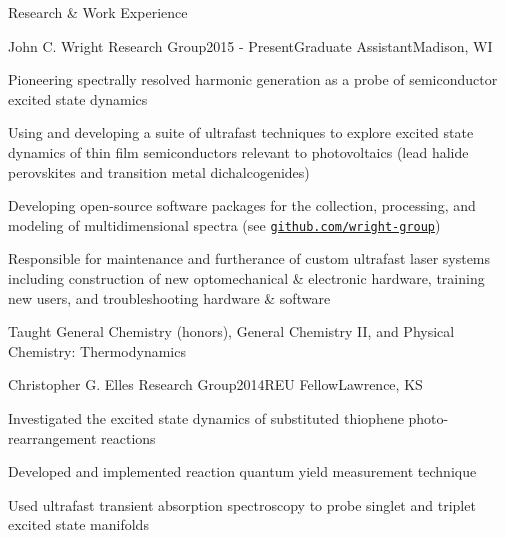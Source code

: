 \documentclass{resume} %
\begin{document}
\begin{rSection}{Research \& Work Experience}

\begin{rSubsection}{John C. Wright Research Group}{2015 - Present}{Graduate Assistant}{Madison, WI}
\item Pioneering spectrally resolved harmonic generation as a probe of semiconductor excited state dynamics
\item Using and developing a suite of ultrafast techniques to explore excited state dynamics of thin film semiconductors relevant to photovoltaics (lead halide perovskites and transition metal dichalcogenides)%
\item Developing open-source software packages for the  collection, processing, and modeling of multidimensional spectra (see \href{http://github.com/wright-group}{\texttt{github.com/wright-group}})
\item Responsible for maintenance and furtherance of custom ultrafast laser systems including construction of new optomechanical \& electronic hardware, training new users, and troubleshooting hardware \& software
\item Taught General Chemistry (honors), General Chemistry II, and Physical Chemistry: Thermodynamics 

\end{rSubsection}

\begin{rSubsection}{Christopher G. Elles Research Group}{2014}{REU Fellow}{Lawrence, KS}
	\item Investigated the excited state dynamics of substituted thiophene photo-rearrangement reactions
	\item Developed and implemented reaction quantum yield measurement technique
	\item Used ultrafast transient absorption spectroscopy to probe singlet and triplet excited state manifolds
\end{rSubsection}



\end{rSection}
\end{document}

